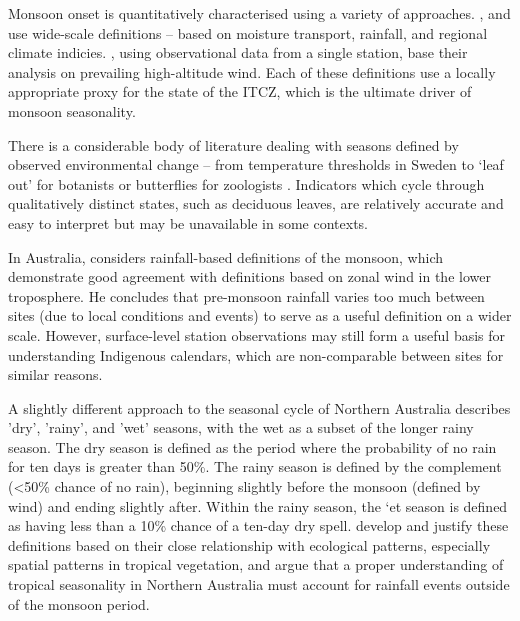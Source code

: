 Monsoon onset is quantitatively characterised using a variety of approaches.
\citet{sultan2003,fasullo2002}, and \citet{wu1998} use wide-scale definitions
-- based on moisture transport, rainfall, and regional climate indicies.
\citet{hendon1990}, using observational data from a single station, base their
analysis on prevailing high-altitude wind.  Each of these definitions use a
locally appropriate proxy for the state of the ITCZ,
which is the ultimate driver of monsoon seasonality.


There is a considerable body of literature dealing with seasons defined
by observed environmental change -- from temperature thresholds in Sweden
 to `leaf out' for botanists \citep[eg.][]{allstadt2015}
or butterflies for zoologists \citep[eg.][]{forister2003,roy2000}.
Indicators which cycle through qualitatively distinct states, such as deciduous
leaves, are relatively accurate and easy to interpret but may be unavailable
in some contexts.

In Australia, \citet{holland1985} considers rainfall-based definitions of the
monsoon, which demonstrate good agreement with definitions based on zonal
wind in the lower troposphere.  He concludes that pre-monsoon
rainfall varies too much between sites (due to local conditions and events)
to serve as a useful definition on a wider scale.
%
However, surface-level station observations may still form a useful basis for
understanding Indigenous calendars, which are non-comparable between sites
for similar reasons.

A slightly different approach to the seasonal cycle of Northern Australia
describes 'dry', 'rainy', and 'wet' seasons, with the wet as a subset of the
longer rainy season.  The dry season is defined as the period where the probability
of no rain for ten days is greater than 50\%.  The rainy season is defined by
the complement (\textless50\% chance of no rain), beginning slightly before the
monsoon (defined by wind) and ending slightly after.  Within the rainy season, the `et season
is defined as having less than a 10\% chance of a ten-day dry spell.
%
\citet{cook2001} develop and justify these definitions based on their close relationship with
ecological patterns, especially spatial patterns in tropical vegetation,
and argue that a proper understanding of tropical seasonality in Northern
Australia must account for rainfall events outside of the monsoon period.



